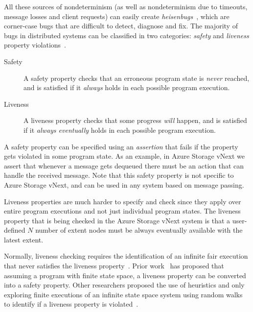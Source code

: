 All these sources of nondeterminism (as well as nondeterminism due to timeouts, message losses and client requests) can easily create \emph{heisenbugs}~\cite{gray1986computers, musuvathi2008finding}, which are corner-case bugs that are difficult to detect, diagnose and fix. The majority of bugs in distributed systems can be classified in two categories: \emph{safety} and \emph{liveness} property violations~\cite{lamport1977proving}.

\begin{description}
\item[Safety] A safety property checks that an erroneous program state is \emph{never} reached, and is satisfied if it \emph{always} holds in each possible program execution.

\item[Liveness] A liveness property checks that some progress \emph{will} happen, and is satisfied if it \emph{always eventually} holds in each possible program execution.
\end{description}

\noindent
A safety property can be specified using an \emph{assertion} that fails if the property gets violated in some program state. As an example, in Azure Storage vNext we assert that whenever a message gets dequeued there must be an action that can handle the received message. Note that this safety property is not specific to Azure Storage vNext, and can be used in any system based on message passing.

Liveness properties are much harder to specify and check since they apply over entire program executions and not just individual program states. The liveness property that is being checked in the Azure Storage vNext system is that a user-defined $N$ number of extent nodes must be always eventually available with the latest extent. 

Normally, liveness checking requires the identification of an infinite fair execution that never satisfies the liveness property~\cite{schuppan2004efficient, musuvathi2008fair}. Prior work~\cite{schuppan2004efficient} has proposed that assuming a program with finite state space, a liveness property can be converted into a safety property. Other researchers proposed the use of heuristics and only exploring finite executions of an infinite state space system using random walks to identify if a liveness property is violated~\cite{killian2007life}.


